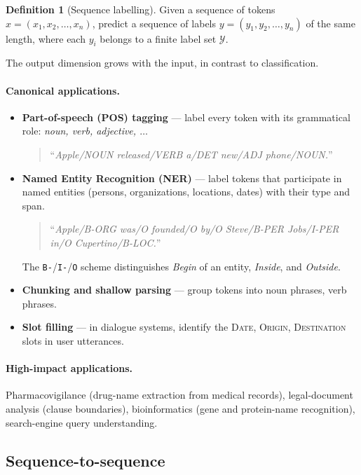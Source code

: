 \documentclass[12pt,a4paper]{report}
\theoremstyle{definition}
\newtheorem{definition}{Definition}[section]
\theoremstyle{remark}
\begin{document}
\begin{definition}[Sequence labelling]
Given a sequence of tokens $x = (x_1, x_2, \dots, x_n)$, predict a sequence of labels $y = (y_1, y_2, \dots, y_n)$ of the same length, where each $y_i$ belongs to a finite label set $\mathcal{Y}$.
\end{definition}

The output dimension grows with the input, in contrast to classification.

\paragraph{Canonical applications.}
\begin{itemize}
    \item \textbf{Part-of-speech (POS) tagging} --- label every token with its grammatical role: \emph{noun, verb, adjective, $\ldots$}
    \begin{quote}
    ``\emph{Apple/NOUN released/VERB a/DET new/ADJ phone/NOUN.}''
    \end{quote}
    \item \textbf{Named Entity Recognition (NER)} --- label tokens that participate in named entities (persons, organizations, locations, dates) with their type and span.
    \begin{quote}
    ``\emph{Apple/B-ORG was/O founded/O by/O Steve/B-PER Jobs/I-PER in/O Cupertino/B-LOC.}''
    \end{quote}
    The \texttt{B-}/\texttt{I-}/\texttt{O} scheme distinguishes \emph{Begin} of an entity, \emph{Inside}, and \emph{Outside}.
    \item \textbf{Chunking and shallow parsing} --- group tokens into noun phrases, verb phrases.
    \item \textbf{Slot filling} --- in dialogue systems, identify the \textsc{Date}, \textsc{Origin}, \textsc{Destination} slots in user utterances.
\end{itemize}

\paragraph{High-impact applications.} Pharmacovigilance (drug-name extraction from medical records), legal-document analysis (clause boundaries), bioinformatics (gene and protein-name recognition), search-engine query understanding.

\subsection{Sequence-to-sequence}
\end{document}
